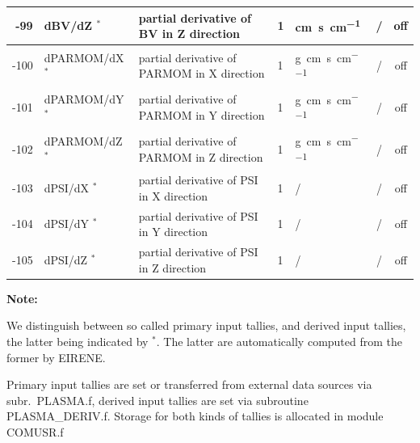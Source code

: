 \begin{landscape}
\begin{longtable}{|r|l|l|l|l|c|c|}
    \\ \hline
    -99                    & dBV/dZ $^*$
                           & partial derivative of BV in Z direction  
                           & 1                            & \si{\centi\metre\second\per\centi\metre}
			   & /              & off         
    \\ \hline
    -100                   & dPARMOM/dX $^*$
                           & partial derivative of PARMOM in X direction  
                           & 1                            & \si{\gram\centi\metre\per\second\per\centi\metre}
			   & /              & off         
    \\ \hline
    -101                   & dPARMOM/dY $^*$
                           & partial derivative of PARMOM in Y direction  
                           & 1                            & \si{\gram\centi\metre\per\second\per\centi\metre}
			   & /              & off         
    \\ \hline
    -102                   & dPARMOM/dZ $^*$
                           & partial derivative of PARMOM in Z direction  
                           & 1                            & \si{\gram\centi\metre\per\second\per\centi\metre}
			   & /              & off         
    \\ \hline
    -103                   & dPSI/dX $^*$
                           & partial derivative of PSI in X direction  
                           & 1                            & /
			   & /              & off         
    \\ \hline
    -104                   & dPSI/dY $^*$
                           & partial derivative of PSI in Y direction  
                           & 1                            & /
			   & /              & off         
    \\ \hline
    -105                   & dPSI/dZ $^*$
                           & partial derivative of PSI in Z direction  
                           & 1                            & /
			   & /              & off         
    \\ \hline
  \end{longtable}

  \textbf{Note:} 

  We distinguish between so called primary input tallies, and derived input 
  tallies, the latter being indicated by $^*$.
  The latter are automatically computed from the former by EIRENE.

  Primary input tallies are set or transferred from external data sources via
  subr.\ PLASMA.f, derived input tallies are set via subroutine PLASMA\_DERIV.f.
  Storage for both kinds of tallies is allocated in module COMUSR.f


\end{landscape}
